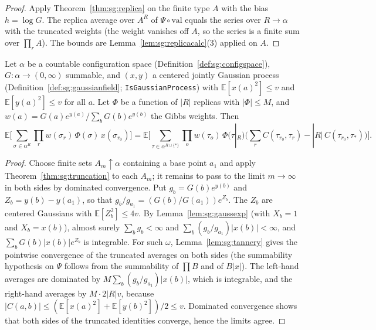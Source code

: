 \begin{proof}
  \leanok
Apply Theorem~\ref{thm:sg:replica} on the finite type $A$ with the bias $h=\log G$. The replica average over $A^R$ of $\Psi\circ\mathrm{val}$ equals the
series over $R\to\alpha$ with the truncated weights (the weight vanishes off $A$, so the series is a finite sum over $\prod_{r}A$). The bounds are
Lemma~\ref{lem:sg:replicacalc}(3) applied on $A$.
\end{proof}

\begin{theorem}\label{thm:sg:lemma12}
  \leanok
Let $\alpha$ be a countable configuration space (Definition~\ref{def:sg:configspace}), $G:\alpha\to(0,\infty)$ summable, and $(x,y)$ a centered jointly Gaussian process (Definition~\ref{def:sg:gaussianfield}; \texttt{IsGaussianProcess}) with
$\mathbb E[x(a)^2]\le v$ and $\mathbb E[y(a)^2]\le v$ for all $a$. Let $\Phi$ be a function of $|R|$ replicas with $|\Phi|\le M$, and
$w(a)=G(a)e^{y(a)}/\sum_bG(b)e^{y(b)}$ the Gibbs weights. Then
\[\mathbb E\big[\sum_{\sigma\in\alpha^R}\prod_rw(\sigma_r)\,\Phi(\sigma)\,x(\sigma_{r_0})\big]
 =\mathbb E\Big[\sum_{\tau\in\alpha^{R\sqcup\{*\}}}\prod_{o}w(\tau_o)\,\Phi(\tau|_R)\Big(\sum_{r}C(\tau_{r_0},\tau_r)-|R|\,C(\tau_{r_0},\tau_*)\Big)\Big].\]
\end{theorem}

\begin{proof}
  \leanok
Choose finite sets $A_m\uparrow\alpha$ containing a base point $a_1$ and apply Theorem~\ref{thm:sg:truncation} to each $A_m$; it remains to pass to the limit
$m\to\infty$ in both sides by dominated convergence. Put $g_b=G(b)e^{y(b)}$ and $Z_b=y(b)-y(a_1)$, so that $g_b/g_{a_1}=(G(b)/G(a_1))e^{Z_b}$. The $Z_b$ are centered Gaussians with
$\mathbb E[Z_b^2]\le4v$. By Lemma~\ref{lem:sg:gaussexp} (with $X_b=1$ and $X_b=x(b)$), almost surely $\sum_bg_b<\infty$ and $\sum_b(g_b/g_{a_1})|x(b)|<\infty$, and
$\sum_bG(b)|x(b)|e^{Z_b}$ is integrable. For such $\omega$, Lemma~\ref{lem:sg:tannery} gives the pointwise convergence of the truncated averages on
both sides (the summability hypothesis on $\Psi$ follows from the summability of $\prod B$ and of $B|x|$). The left-hand averages are dominated by
$M\sum_b(g_b/g_{a_1})|x(b)|$, which is integrable, and the right-hand averages by $M\cdot2|R|v$, because $|C(a,b)|\le(\mathbb E[x(a)^2]+\mathbb E[y(b)^2])/2\le v$.
Dominated convergence shows that both sides of the truncated identities converge, hence the limits agree.
\end{proof}

